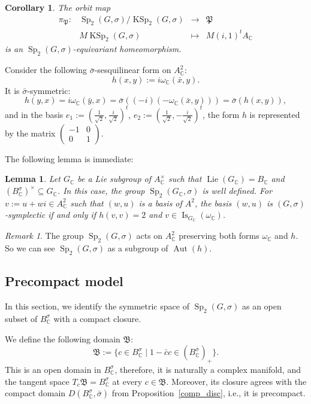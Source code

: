 \documentclass[a4paper,oneside,11pt]{amsart}
\DeclareMathOperator{\Aut}{Aut}
\DeclareMathOperator{\Sp}{Sp}
\DeclareMathOperator{\Lie}{Lie}
\DeclareMathOperator{\KSp}{KSp}
\DeclareMathOperator{\Is}{Is}
\newcommand{\CC}{\mathbb C}
\theoremstyle{plain}
\newtheorem{cor}[teo]{Corollary}
\newtheorem{lem}[teo]{Lemma}
\theoremstyle{definition}
\theoremstyle{remark}
\newtheorem{rem}[teo]{Remark}
\begin{document}
\begin{cor}
The orbit map
$$\begin{matrix}
\pi_\mathfrak P\colon & \Sp_2(G,\sigma)/\KSp_2(G,\sigma) & \to & \mathfrak P \\
 & M\KSp_2(G,\sigma) & \mapsto & M(i,1)^tA_\CC
\end{matrix}$$
is an $\Sp_2(G,\sigma)$-equivariant homeomorphism.
\end{cor}


Consider the following $\bar\sigma$-sesquilinear form on $A^2_\CC$:
\begin{equation}\label{eq:form_h}
    h(x,y):=i\omega_\CC(\bar x,y).    
\end{equation}
It is $\bar\sigma$-symmetric:
$$h(y,x)=i\omega_\CC(\bar y,x)=\bar\sigma((-i)(-\omega_\CC(\bar x,y)))=\bar\sigma(h(x,y)),$$
and in the basis $e_1:=\left(\frac{1}{\sqrt{2}},\frac{i}{\sqrt{2}}\right)^t$, $e_2:=\left(\frac{1}{\sqrt{2}},-\frac{i}{\sqrt{2}}\right)^t$, the form $h$ is represented by the matrix $\begin{pmatrix} -1 & 0 \\ 0 & 1\end{pmatrix}$.

The following lemma is immediate:
\begin{lem}\label{G-SympBas-h=2}
Let $G_\mathbb C$ be a Lie subgroup of $A^\times_\mathbb C$ such that $\Lie(G_\mathbb C)=B_\mathbb C$ and $(B^{\sigma}_\CC)^\times\subseteq G_\CC$. In this case, the group $\Sp_2(G_\CC,\sigma)$ is well defined. For $v:=u+wi\in A_\CC^2$ such that $(w,u)$ is a basis of $A^2$, the basis $(w,u)$ is $(G,\sigma)$-symplectic if and only if  $h(v,v)=2$ and $v\in\Is_{G_\CC}(\omega_\CC)$.
\end{lem}


\begin{rem}
The group $\Sp_2(G,\sigma)$ acts on $A_\CC^2$ preserving both forms $\omega_\CC$ and $h$. So we can see $\Sp_2(G,\sigma)$ as a subgroup of $\Aut(h)$.
\end{rem}

\subsection{Precompact model}\label{Precomp_Mod_R}

In this section, we identify the symmetric space of $\Sp_2(G,\sigma)$ as an open subset of $B^\sigma_\mathbb C$ with a compact closure. 

We define the following domain $\mathfrak B$:
$$\mathfrak B\!:=\{c\in B^\sigma_\CC\mid 1-\bar c c\in (B^{\bar\sigma}_\CC)_+\}.$$
This is an open domain in $B^\sigma_\CC$, therefore, it is naturally a complex manifold, and the tangent space $T_c\mathfrak B=B^\sigma_\CC$ at every $c\in \mathfrak B$. Moreover, its closure agrees with the compact domain $D(B_\mathbb C^\sigma,\bar\sigma)$ from Proposition~\ref{comp_disc}, i.e., it is precompact.
\end{document}
